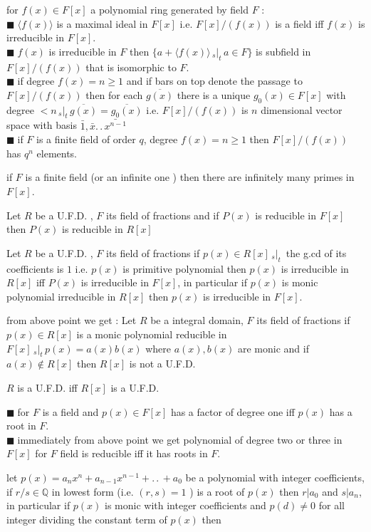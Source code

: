 \documentclass[11pt]{extarticle}
\newcommand{\Q}{\mathbb{Q}}
\newcommand{\ck}{.\,.\,}
\newcommand{\snote}[1]{{\footnotesize(#1)}}
\newcommand{\st}{\,{}_{s}|_t\,}
\newcommand{\gen}[1]{\langle #1 \rangle}
\newcommand{\tbx}[2][]{
	\begin{tcolorbox}[enhanced,breakable,size=small,colback=black!2!white,title={#1},arc is angular, arc=1.5mm,drop fuzzy shadow]
		#2
	\end{tcolorbox}
}
\newcommand{\y}{$\blacksquare\;$}
\begin{document}
\begin{multicols}{2}
\tbx{for $ f(x)\in F[x] $ a polynomial ring generated by field $ F $ :\\
			\y $ \gen{f(x)} $ is a maximal ideal in $ F[x] $ i.e. $ F[x]/(f(x)) $ is a field iff  $ f(x) $ is irreducible in $ F[x] .$\\
		  \y  $ f(x) $ is irreducible in $ F $ then $ \{a+\gen{f(x)}\st a\in F\} $ is subfield in $ F[x]/(f(x)) $ that is isomorphic to $ F .$ \\
			\y if  degree $  f(x) =n\geq 1$ and if bars on top denote the passage to $ F[x]/(f(x))  $ then for each  
			$ \overline{g(x)} $ there is a unique $ g_0(x)\in F[x] $ with degree $ <n \st \overline{g(x)}=\overline{g_0(x)}$ 
			i.e. $ F[x]/(f(x)) $ is $ n $ dimensional vector space with basis $ \bar{1},\bar{x}\ck \bar{x^{n-1}} $  \\
			\y if $ F $ is a finite field of order $ q$, degree $  f(x) =n\geq 1$ then $ F[x]/(f(x))  $ has $ q^n $ elements. \\
			} 
\tbx{if $ F $ is a finite field \snote{or an infinite one } then there are infinitely many primes in $ F[x] $.
			} 
\tbx[\textbf{Gauss Lemma} ]{Let $ R $ be a U.F.D. , $ F $ its field of fractions and if $ P(x) $ is reducible in $ F[x] $ then $ P(x) $ is reducible in $ R[x] $
			} 
\tbx[sort of converse of Gauss Lemma]{ Let $ R $ be a U.F.D. , $ F $ its field of fractions if $ p(x)\in R[x] \st$ the g.cd of its coefficients is $ 1 $ i.e. 
			$ p(x) $ is primitive polynomial then $ p(x) $ is irreducible in $ R[x] $ iff $P(x) $ is irreducible in $ F[x] $, in particular if $ p(x) $ is monic polynomial irreducible in $ R[x] $ then $ p(x) $ is irreducible in $ F[x] $.
			} 
\tbx{from above point we get : Let $ R $ be a integral domain, $ F $ its field of fractions if $ p(x)\in R[x] $ is a monic polynomial reducible in  $F[x]  \st p(x) =a(x)b(x)$ where $ a(x),b(x)$ are monic and if $ a(x) \notin R[x]$ then 
			$ R[x] $ is not a U.F.D.  
			} 
\tbx{$ R $ is a U.F.D. iff $R[x]$ is a U.F.D.
			} 
\tbx[Irreducibility Criterion and properties]{
\y for $ F $ is a field and $ p(x)\in F[x] $ has a factor of degree one iff $ p(x) $ has a root in $ F$.\\
\y immediately from above point we get polynomial of degree two or three in $ F[x] $ for $ F $ field is reducible  iff it has roots in $ F $.
\tbx[Rational root Theorem]{ let $ p(x)=a_nx^n+a_{n-1}x^{n-1}+\ck + a_0 $ be a polynomial with integer coefficients, if $ r/s \in \Q$ in lowest form \snote{i.e. $ (r,s) =1$ } is a root of $ p(x) $ then $ r|a_0 $ and $ s|a_n $, in particular if  $ p(x)$ is monic with integer coefficients and $ p(d)\neq 0 $ for all integer dividing the constant term of $ p(x) $ then 
}}
\end{multicols}
\end{document}
